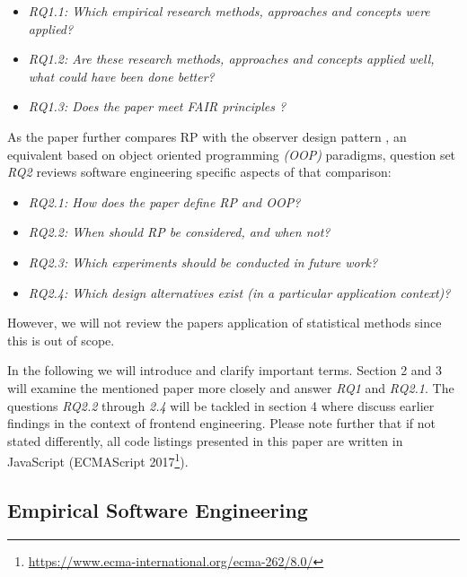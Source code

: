 \documentclass[12pt,a4paper]{article}
\begin{document}
\begin{itemize}
	\item \emph{RQ1.1: Which empirical research methods, approaches and concepts were applied?}
	\item \emph{RQ1.2: Are these research methods, approaches and concepts applied well, what could have been done better?}
	\item \emph{RQ1.3: Does the paper meet FAIR principles \cite{2019arXiv190805986H} \cite{wilkinson:2016}?}
\end{itemize}

As the paper further compares RP with the observer design pattern \cite{gamma1995design}, an equivalent based on object oriented programming \emph{(OOP)} paradigms, question set \emph{RQ2} reviews software engineering specific aspects of that comparison:

\begin{itemize}
	\item \emph{RQ2.1: How does the paper define RP and OOP?}
	\item \emph{RQ2.2: When should RP be considered, and when not?}
	\item \emph{RQ2.3: Which experiments should be conducted in future work?}
	\item \emph{RQ2.4: Which design alternatives exist (in a particular application context)?}
\end{itemize}

However, we will not review the papers application of statistical methods since this is out of scope.

In the following we will introduce and clarify important terms. Section 2 and 3 will examine the mentioned paper more closely and answer \emph{RQ1} and \emph{RQ2.1}. The questions \emph{RQ2.2} through \emph{2.4} will be tackled in section 4 where discuss earlier findings in the context of frontend engineering. Please note  further that if not stated differently, all code listings presented in this paper are written in JavaScript (ECMAScript 2017\footnote{\url{https://www.ecma-international.org/ecma-262/8.0/}}).

\subsection{Empirical Software Engineering}
\end{document}
